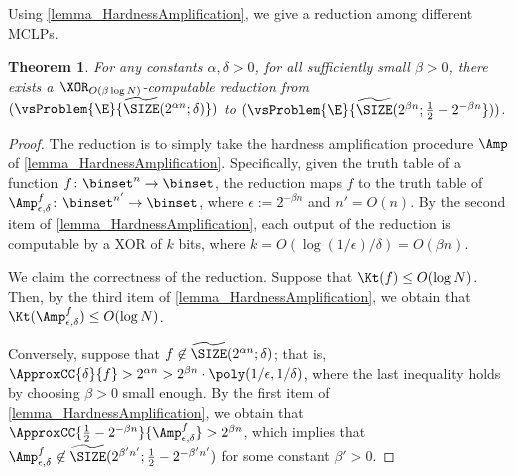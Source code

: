 \documentclass[11pt]{article}
\numberwithin{equation}{section}
\newtheorem{theorem}{Theorem}[section]
\theoremstyle{definition}
\theoremstyle{plain}
\begin{document}
Using \cref{lemma_HardnessAmplification}, we give a reduction among
different MCLPs.
\begin{theorem}
  \label{thm_Amplification}
  For any constants $\alpha, \delta > 0$,
  for all sufficiently small $\beta > 0$,
  there exists
  a $\XOR_{O(\beta \log N)}$-computable reduction from
  $(\vsProblem{\E}{\widetilde{\SIZE}(2^{\alpha n}; \delta)})$
  to
  $(\vsProblem{\E}{\widetilde{\SIZE}(2^{\beta n}; \frac{1}{2} - 2^{-\beta n}}))$.
\end{theorem}

\begin{proof}
  The reduction is to simply take the hardness amplification procedure $\Amp$ of \cref{lemma_HardnessAmplification}.
  Specifically,
  given the truth table of a function $f \colon \binset^n \to \binset$, the reduction maps $f$ to the truth table of $\Amp^f_{\epsilon, \delta} \colon \binset^{n'} \to \binset$,
  where $\epsilon := 2^{- \beta n}$ and $n' = O(n)$.
  By the second item of \cref{lemma_HardnessAmplification},
  each output of the reduction is computable by a XOR of $k$ bits, where $k = O(\log (1 / \epsilon) / \delta ) = O(\beta n)$.

  We claim the correctness of the reduction.
  Suppose that $\Kt(f) \le O( \log N )$.
  Then, by the third item of \cref{lemma_HardnessAmplification},
  we obtain that $\Kt(\Amp_{\epsilon, \delta}^f) \le O(\log N)$.

  Conversely, suppose that $f \not\in \widetilde{\SIZE}(2^{\alpha n}; \delta)$;
  that is, $\ApproxCC{\delta}{f} > 2^{\alpha n} > 2^{\beta n} \cdot \poly(1 / \epsilon, 1 / \delta)$,
  where the last inequality holds by choosing $\beta > 0$ small enough.
  By the first item of \cref{lemma_HardnessAmplification},
  we obtain that $\ApproxCC{\frac{1}{2} - 2^{- \beta n}}{\Amp_{\epsilon, \delta}^f} > 2^{\beta n}$,
  which implies that $\Amp_{\epsilon, \delta}^f \not\in \widetilde{\SIZE}(2^{\beta' n'}; \frac{1}{2} - 2^{-\beta' n'})$
  for some constant $\beta' > 0$.
\end{proof}
\end{document}

